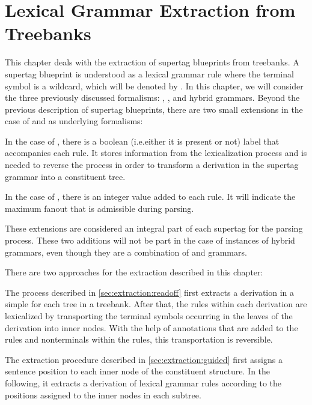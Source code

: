 \documentclass[../document.tex]{subfiles}
\begin{document}
    \chapter{Lexical Grammar Extraction from Treebanks}
    This chapter deals with the extraction of supertag blueprints from treebanks.
    A supertag blueprint is understood as a lexical grammar rule where the terminal symbol is a wildcard, which will be denoted by \tn{*}.
    In this chapter, we will consider the three previously discussed formalisms: , , and hybrid grammars.
    Beyond the previous description of supertag blueprints, there are two small extensions in the case of  and  as underlying formalisms:
    \begin{compactenum}
        \item
            In the case of , there is a boolean (i.e.\@ either it is present or not) label that accompanies each rule.
            It stores information from the lexicalization process and is needed to reverse the process in order to transform a derivation in the supertag grammar into a constituent tree.
        \item
            In the case of , there is an integer value added to each rule.
            It will indicate the maximum fanout that is admissible during parsing.
    \end{compactenum}
    These extensions are considered an integral part of each supertag for the parsing process.
    These two additions will not be part in the case of instances of hybrid grammars, even though they are a combination of  and  grammars.

    There are two approaches for the extraction described in this chapter:
    \begin{compactenum}
        \item
            The process described in \cref{sec:extraction:readoff} first extracts a derivation in a simple  for each tree in a treebank.
            After that, the rules within each derivation are lexicalized by transporting the terminal symbols occurring in the leaves of the derivation into inner nodes.
            With the help of annotations that are added to the rules and nonterminals within the rules, this transportation is reversible.
        \item
            The extraction procedure described in \cref{sec:extraction:guided} first assigns a sentence position to each inner node of the constituent structure.
            In the following, it extracts a derivation of lexical grammar rules according to the positions assigned to the inner nodes in each subtree.
    \end{compactenum}
\end{document}
